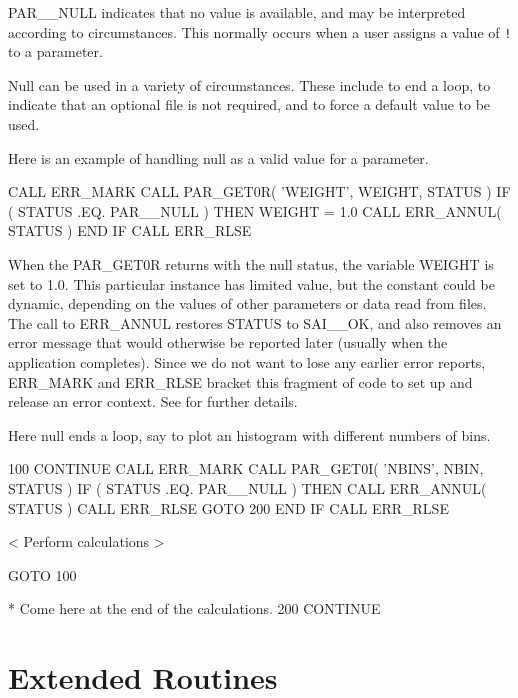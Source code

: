 \documentclass[twoside,11pt,nolof]{starlink}
\begin{document}
PAR\_\_NULL indicates that no value is available, and may be interpreted
according to circumstances.  This normally occurs when a user assigns a
value of \texttt{!} to a parameter.

Null can be used in a variety of circumstances.  These include to
end a loop, to indicate that an optional file is not required, and to
force a default value to be used.

Here is an example of handling null as a valid value for a parameter.

\begin{terminalv}
      CALL ERR_MARK
      CALL PAR_GET0R( 'WEIGHT', WEIGHT, STATUS )
      IF ( STATUS .EQ. PAR__NULL ) THEN
         WEIGHT = 1.0
         CALL ERR_ANNUL( STATUS )
      END IF
      CALL ERR_RLSE
\end{terminalv}

When the PAR\_GET0R returns with the null status, the variable WEIGHT is
set to 1.0.  This particular instance has limited value, but the
constant could be dynamic, depending on the values of other parameters
or data read from files.  The call to ERR\_ANNUL restores STATUS to
SAI\_\_OK, and also removes an error message that would otherwise be
reported later (usually when the application completes).  Since we do
not want to lose any earlier error reports, ERR\_MARK and ERR\_RLSE
bracket this fragment of code to set up and release an error context.
See
for further details.

Here null ends a loop, say to plot an histogram with different numbers
of bins.
\begin{terminalv}
  100 CONTINUE
      CALL ERR_MARK
      CALL PAR_GET0I( 'NBINS', NBIN, STATUS )
      IF ( STATUS .EQ. PAR__NULL ) THEN
         CALL ERR_ANNUL( STATUS )
         CALL ERR_RLSE
         GOTO 200
      END IF
      CALL ERR_RLSE

          < Perform calculations >

      GOTO 100

*   Come here at the end of the calculations.
  200 CONTINUE
\end{terminalv}

\section{Extended Routines}
\label{se:extended}
\end{document}
